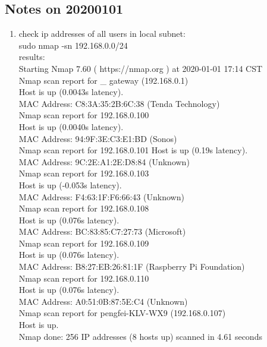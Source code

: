 \documentclass[UTF8,fancyhdr,a4paper]{ctexart}
\begin{document}
\subsection{Notes on 20200101}
\begin{enumerate}
\item
check ip addresses of all users in local subnet:\\
sudo nmap -sn 192.168.0.0/24\\
results:\\
Starting Nmap 7.60 ( https://nmap.org ) at 2020-01-01 17:14 CST\\
Nmap scan report for \_ gateway (192.168.0.1)\\
Host is up (0.0043s latency).\\
MAC Address: C8:3A:35:2B:6C:38 (Tenda Technology)\\
Nmap scan report for 192.168.0.100\\
Host is up (0.0040s latency).\\
MAC Address: 94:9F:3E:C3:E1:BD (Sonos)\\
Nmap scan report for 192.168.0.101
Host is up (0.19s latency).\\
MAC Address: 9C:2E:A1:2E:D8:84 (Unknown)\\
Nmap scan report for 192.168.0.103\\
Host is up (-0.053s latency).\\
MAC Address: F4:63:1F:F6:66:43 (Unknown)\\
Nmap scan report for 192.168.0.108\\
Host is up (0.076s latency).\\
MAC Address: BC:83:85:C7:27:73 (Microsoft)\\
Nmap scan report for 192.168.0.109\\
Host is up (0.076s latency).\\
MAC Address: B8:27:EB:26:81:1F (Raspberry Pi Foundation)\\
Nmap scan report for 192.168.0.110\\
Host is up (0.076s latency).\\
MAC Address: A0:51:0B:87:5E:C4 (Unknown)\\
Nmap scan report for pengfei-KLV-WX9 (192.168.0.107)\\
Host is up.\\
Nmap done: 256 IP addresses (8 hosts up) scanned in 4.61 seconds\\




\end{enumerate}
\end{document}

